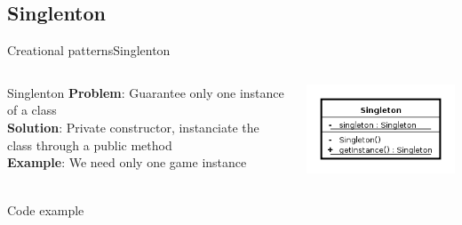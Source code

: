 \documentclass[10pt,compress]{beamer} %
\begin{document}
\subsection[Singlenton]{Singlenton}
\begin{frame}[plain]{Creational patterns}{Singlenton}
    \begin{columns}
	   \begin{block}{Singlenton}
			\textbf{Problem}: Guarantee only one instance of a class\\
			\textbf{Solution}: Private constructor, instanciate the class through a public method\\
			\textbf{Example}: We need only one game instance\\
		\end{block}
			\centering\includegraphics[width=\linewidth]{figs/singlenton}\\
\end{columns}
    \begin{block}{Code example}
	    \vspace{-0.2cm}
	    
		\vspace{-0.2cm}
	\end{block}
\end{frame}
\end{document}
